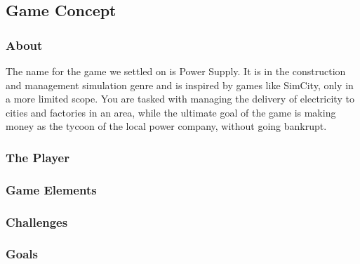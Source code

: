 \subsection{Game Concept}

\subsubsection{About}
The name for the game we settled on is Power Supply. It is in the construction and management simulation genre and is inspired by games like SimCity, only in a more limited scope. You are tasked with managing the delivery of electricity to cities and factories in an area, while the ultimate goal of the game is making money as the tycoon of the local power company, without going bankrupt.

\subsubsection{The Player}

\subsubsection{Game Elements}

\subsubsection{Challenges}

\subsubsection{Goals}
